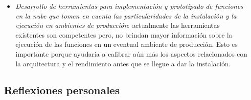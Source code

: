 \begin{itemize}
    \item \emph{Desarrollo de herramientas para implementación y prototipado de funciones en la nube que tomen en cuenta las particularidades de la instalación y la ejecución en ambientes de producción}: actualmente las herramientas existentes son competentes pero, no brindan mayor información sobre la ejecución de las funciones en un eventual ambiente de producción. Esto es importante porque ayudaría a calibrar aún más los aspectos relacionados con la arquitectura y el rendimiento antes que se llegue a dar la instalación.
\end{itemize}



\subsection{Reflexiones personales}
